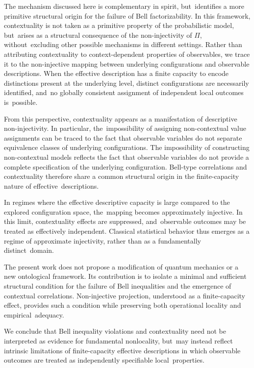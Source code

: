 \documentclass[11pt,a4paper]{article}
\theoremstyle{remark}
\begin{document}
    The mechanism discussed here is complementary in spirit, but~identifies a more
    primitive structural origin for the failure of Bell factorizability.
    In this framework, contextuality is not taken as a primitive property of the
    probabilistic model, but~arises as a structural consequence of the non-injectivity
    of $\Pi$, without~excluding other possible mechanisms in different settings.
    Rather than attributing contextuality to context-dependent properties of observables,
    we trace it to the non-injective mapping between underlying configurations and
    observable descriptions.
    When the effective description has a finite capacity to encode distinctions present
    at the underlying level, distinct configurations are necessarily identified, and~no
    globally consistent assignment of independent local outcomes is~possible.

    From this perspective, contextuality appears as a manifestation of descriptive
    non-injectivity.
    In particular, the~impossibility of assigning non-contextual value assignments
    can be traced to the fact that observable variables do not separate equivalence classes
    of underlying configurations.
    The impossibility of constructing non-contextual models reflects the fact that
    observable variables do not provide a complete specification of the underlying
    configuration.
    Bell-type correlations and contextuality therefore share a common structural origin
    in the finite-capacity nature of effective~descriptions.

    In regimes where the effective descriptive capacity is large compared to the
    explored configuration space, the~mapping becomes approximately injective.
    In this limit, contextuality effects are suppressed, and~observable outcomes may be
    treated as effectively independent.
    Classical statistical behavior thus emerges as a regime of approximate injectivity,
    rather than as a fundamentally distinct~domain.

    The present work does not propose a modification of quantum mechanics or a new
    ontological framework.
    Its contribution is to isolate a minimal and sufficient structural condition for the
    failure of Bell inequalities and the emergence of contextual correlations.
    Non-injective projection, understood as a finite-capacity effect, provides such a
    condition while preserving both operational locality and empirical~adequacy.

    We conclude that Bell inequality violations and contextuality need not be interpreted
    as evidence for fundamental nonlocality, but~may instead reflect intrinsic limitations
    of finite-capacity effective descriptions in which observable outcomes are treated as
    independently specifiable local~properties.
\end{document}
